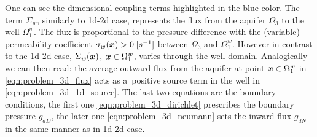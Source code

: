 One can see the dimensional coupling terms highlighted in the blue color.
The term $\Sigma_w$, similarly to 1d-2d case, represents the flux from the aquifer $\Omega_3$ to the well $\Omega^w_1$.
The flux is proportional to the pressure difference with the (variable) permeability coefficient $\sigma_w(\mathbf{\boldsymbol{x}})>0\;[s^{-1}]$ between $\Omega_3$ and $\Omega^w_1$.
However in contrast to the 1d-2d case, $\Sigma_w(\mathbf{\boldsymbol{x}})$, $\mathbf{\boldsymbol{x}}\in\Omega^w_1$, varies through the well domain.
Analogically we can then read: the average outward flux from the aquifer at point $\mathbf{\boldsymbol{x}}\in\Omega^w_1$
in \eqref{eqn:problem_3d_flux} acts as a~positive source term in the well in \eqref{eqn:problem_3d_1d_source}.
The last two equations are the boundary conditions, the first one \eqref{eqn:problem_3d_dirichlet} prescribes the boundary pressure $g_{dD}$, 
the later one \eqref{eqn:problem_3d_neumann} sets the inward flux $g_{dN}$ in the same manner as in 1d-2d case.

